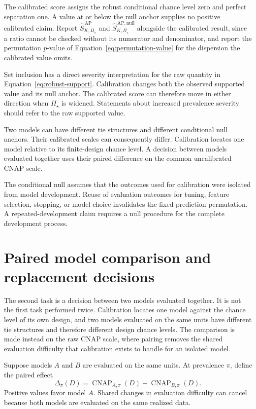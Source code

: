 \documentclass[11pt]{article}
\newcommand{\CNAP}{\operatorname{CNAP}}
\newcommand{\PSet}{\Pi_\star}
\newcommand{\SRobHat}{\widehat S_{K,\PSet}^{\,\mathrm{AP}}}
\newcommand{\SRobNullHat}{\widehat S_{K,\PSet}^{\,\mathrm{AP,null}}}
\theoremstyle{remark}
\begin{document}
The calibrated score assigns the robust conditional chance level zero and perfect separation one. A value at or below the null anchor supplies no positive calibrated claim. Report $\SRobHat$ and $\SRobNullHat$ alongside the calibrated result, since a ratio cannot be checked without its numerator and denominator, and report the permutation $p$-value of Equation~\eqref{eq:permutation-value} for the dispersion the calibrated value omits.

Set inclusion has a direct severity interpretation for the raw quantity in Equation~\eqref{eq:robust-support}. Calibration changes both the observed supported value and its null anchor. The calibrated score can therefore move in either direction when $\PSet$ is widened. Statements about increased prevalence severity should refer to the raw supported value.

Two models can have different tie structures and different conditional null anchors. Their calibrated scales can consequently differ. Calibration locates one model relative to its finite-design chance level. A decision between models evaluated together uses their paired difference on the common uncalibrated CNAP scale.

The conditional null assumes that the outcomes used for calibration were isolated from model development. Reuse of evaluation outcomes for tuning, feature selection, stopping, or model choice invalidates the fixed-prediction permutation. A repeated-development claim requires a null procedure for the complete development process.

\section{Paired model comparison and replacement decisions}
\label{sec:paired}

The second task is a decision between two models evaluated together. It is not the first task performed twice. Calibration locates one model against the chance level of its own design, and two models evaluated on the same units have different tie structures and therefore different design chance levels. The comparison is made instead on the raw CNAP scale, where pairing removes the shared evaluation difficulty that calibration exists to handle for an isolated model.

Suppose models $A$ and $B$ are evaluated on the same units. At prevalence $\pi$, define the paired effect
\begin{equation}
\Delta_\pi(D)
=
\CNAP_{A,\pi}(D)
-
\CNAP_{B,\pi}(D).
\label{eq:paired-effect}
\end{equation}
Positive values favor model $A$. Shared changes in evaluation difficulty can cancel because both models are evaluated on the same realized data.
\end{document}

